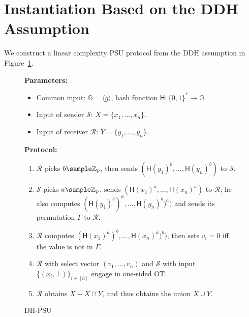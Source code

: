 \section{Instantiation Based on the DDH Assumption}\label{sec:protocols}
We construct a linear complexity PSU protocol from the DDH assumption in Figure~\ref{fig:DH-PSU}.  
\begin{figure}[!hbtp]
\begin{framed}
\begin{minipage}[center]{\textwidth}
\begin{trivlist}
\item \textbf{Parameters:} 
\begin{itemize}
    \item Common input: $\mathbb{G} = \langle g \rangle$, hash function $\mathsf{H}: \{0,1\}^* \rightarrow \mathbb{G}$. 

    \item Input of sender $\mathcal{S}$: $X = \{x_1, \dots, x_n\}$.

    \item Input of receiver $\mathcal{R}$: $Y = \{y_1, \dots, y_n\}$. 
\end{itemize}

\item \textbf{Protocol:}

\begin{enumerate}
\item $\mathcal{R}$ picks $b \sample \mathbb{Z}_p$, then sends $(\mathsf{H}(y_1)^b, \dots, \mathsf{H}(y_n)^b)$ to $\mathcal{S}$. 

\item $\mathcal{S}$ picks $a \sample \mathbb{Z}_p$, 
    sends $(\mathsf{H}(x_1)^a, \dots, \mathsf{H}(x_n)^a)$ to $\mathcal{R}$; 
    he also computes $(\mathsf{H}(y_1)^b)^a, \dots, \mathsf{H}(y_n)^b)^a)$ and sends its permutation $\Gamma$ to $\mathcal{R}$. 


\item $\mathcal{R}$ computes $(\mathsf{H}(x_1)^a)^b, \dots, \mathsf{H}(x_n)^a)^b)$, 
    then sets $v_i = 0$ iff the value is not in $\Gamma$. 

\item $\mathcal{R}$ with select vector $(v_1, \dots, v_n)$ and $\mathcal{S}$ with input $\{(x_i, \bot)\}_{i \in [n]}$ 
    engage in one-sided OT. 

\item $\mathcal{R}$ obtains $X - X \cap Y$, and thus obtains the union $X \cup Y$.  
\end{enumerate}
\end{trivlist}
\end{minipage}
\end{framed}
\caption{DH-PSU}\label{fig:DH-PSU}
\end{figure}

